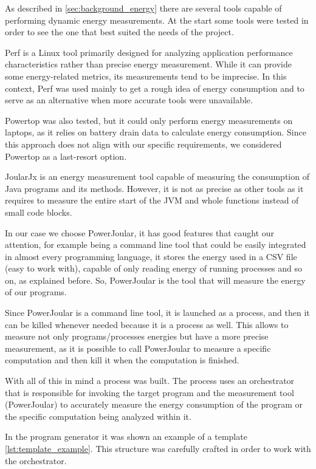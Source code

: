 As described in \ref{sec:background_energy} there are several tools capable of performing dynamic energy measurements.
At the start some tools were tested in order to see the one that best suited the needs of the project.

Perf is a Linux tool primarily designed for analyzing application performance characteristics rather than precise energy measurement. While it can provide some energy-related metrics, its measurements tend to be imprecise. In this context, Perf was used mainly to get a rough idea of energy consumption and to serve as an alternative when more accurate tools were unavailable.

Powertop was also tested, but it could only perform energy measurements on laptops, as it relies on battery drain data to calculate energy consumption. Since this approach does not align with our specific requirements, we considered Powertop as a last-resort option.

JoularJx is an energy measurement tool capable of measuring the consumption of Java programs and its methods. However, it is not as precise as other tools as it requires to measure the entire start of the JVM and whole functions instead of small code blocks.

In our case we choose PowerJoular, it has good features that caught our attention, for example being a command line tool that could be easily integrated in almost every programming language, it stores the energy used in a CSV file (easy to work with), capable of only reading energy of running processes and so on, as explained before. So, PowerJoular is the tool that will measure the energy of our programs.

Since PowerJoular is a command line tool, it is launched as a process, and then it can be killed whenever needed because it is a process as well. This allows to measure not only programs/processes energies but have a more precise measurement, as it is possible to call PowerJoular to measure a specific computation and then kill it when the computation is finished.

With all of this in mind a process was built. The process uses an orchestrator that is responsible for invoking the target program and the measurement tool (PowerJoular) to accurately measure the energy consumption of the program or the specific computation being analyzed within it.

In the program generator it was shown an example of a template \ref{lst:template_example}. This structure was carefully crafted in order to work with the orchestrator.




